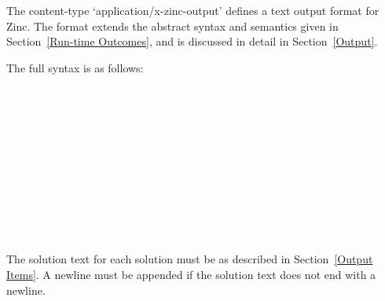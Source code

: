\documentclass[10pt]{scrartcl}
\begin{document}
The content-type `application/x-zinc-output' defines
a text output format for Zinc.
The format extends the abstract syntax and semantics
given in Section~\ref{Run-time Outcomes},
and is discussed in detail in Section~\ref{Output}.

The full syntax is as follows:

\begin{productions}
\RuleOutput \\
\\
\RuleSolution \\
\\
\RuleOutcomeStrings \\
\\
\RuleComplete \\
\\
\RuleWarnings \\
\\
\RuleMessage
\end{productions}

\noindent
The solution text for each solution must be
as described in Section~\ref{Output Items}.
A newline must be appended if the solution text does not end with a newline.

\end{document}
